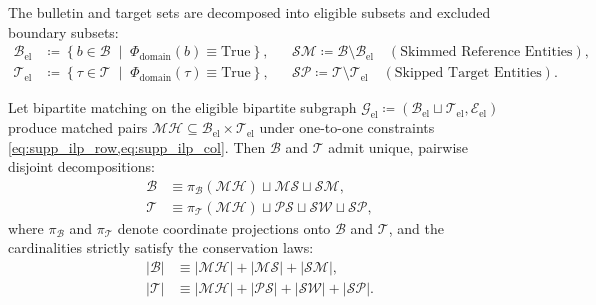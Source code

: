 \begin{definition}
  The bulletin and target sets are decomposed into eligible subsets
  and excluded boundary subsets:
  \begin{align}
    \mathcal{B}_{\mathrm{el}} &\coloneqq \left\{ b \in \mathcal{B}
    \;\middle|\; \Phi_{\mathrm{domain}}(b) \equiv \mathrm{True} \right\},
    && \mathcal{SM} \coloneqq \mathcal{B} \setminus
    \mathcal{B}_{\mathrm{el}} \quad (\text{Skimmed Reference Entities}),
    \label{eq:supp_def_skimmed} \\
    \mathcal{T}_{\mathrm{el}} &\coloneqq \left\{ \tau \in
      \mathcal{T} \;\middle|\; \Phi_{\mathrm{domain}}(\tau) \equiv
    \mathrm{True} \right\},
    && \mathcal{SP} \coloneqq \mathcal{T} \setminus
    \mathcal{T}_{\mathrm{el}} \quad (\text{Skipped Target Entities}).
    \label{eq:supp_def_skipped}
  \end{align}
\end{definition}

\begin{theorem}
  \label{thm:supp_partition_conservation}
  Let bipartite matching on the eligible bipartite subgraph
  $\mathcal{G}_{\mathrm{el}}
  \coloneqq (\mathcal{B}_{\mathrm{el}} \sqcup
  \mathcal{T}_{\mathrm{el}}, \mathcal{E}_{\mathrm{el}})$
  produce matched pairs $\mathcal{MH} \subseteq
  \mathcal{B}_{\mathrm{el}} \times \mathcal{T}_{\mathrm{el}}$
  under one-to-one constraints \cref{eq:supp_ilp_row,eq:supp_ilp_col}.
  Then $\mathcal{B}$ and $\mathcal{T}$ admit unique, pairwise
  disjoint decompositions:
  \begin{align}
    \mathcal{B} &\equiv \pi_{\mathcal{B}}(\mathcal{MH}) \sqcup
    \mathcal{MS} \sqcup \mathcal{SM},
    \label{eq:supp_decomp_b} \\
    \mathcal{T} &\equiv \pi_{\mathcal{T}}(\mathcal{MH}) \sqcup
    \mathcal{PS} \sqcup \mathcal{SW} \sqcup \mathcal{SP},
    \label{eq:supp_decomp_t}
  \end{align}
  where $\pi_{\mathcal{B}}$ and $\pi_{\mathcal{T}}$ denote
  coordinate projections onto
  $\mathcal{B}$ and $\mathcal{T}$, and the cardinalities strictly
  satisfy the conservation laws:
  \begin{align}
    |\mathcal{B}| &\equiv |\mathcal{MH}| + |\mathcal{MS}| + |\mathcal{SM}|,
    \label{eq:supp_card_b} \\
    |\mathcal{T}| &\equiv |\mathcal{MH}| + |\mathcal{PS}| +
    |\mathcal{SW}| + |\mathcal{SP}|.
    \label{eq:supp_card_t}
  \end{align}
\end{theorem}

